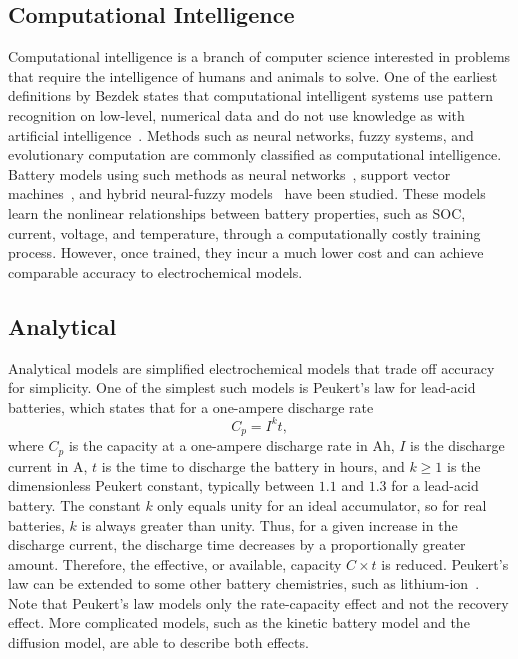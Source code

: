\documentclass[../zhang_thesis.tex]{subfiles}
\begin{document}
\subsection{Computational Intelligence}

Computational intelligence is a branch of computer science interested in problems that require the intelligence of humans and animals to solve. One of the earliest definitions by Bezdek states that computational intelligent systems use pattern recognition on low-level, numerical data and do not use knowledge as with artificial intelligence~\cite{bezdek92,bezdek94}. Methods such as neural networks, fuzzy systems, and evolutionary computation are commonly classified as computational
intelligence. Battery models using such methods as neural networks~\cite{ogorman98,capizzi11}, support vector machines~\cite{wang06}, and hybrid neural-fuzzy models~\cite{shen02} have been studied. These models learn the nonlinear relationships between battery properties, such as SOC, current, voltage, and temperature, through a computationally costly training process. However, once trained, they incur a much lower cost and can achieve comparable accuracy to electrochemical
models.

\subsection{Analytical}

Analytical models are simplified electrochemical models that trade off accuracy for simplicity. One of the simplest such models is Peukert's law for lead-acid batteries, which states that for a one-ampere discharge rate~\cite{doerffel06}
\begin{equation}
C_p = I^k t,
\end{equation}
where $C_p$ is the capacity at a one-ampere discharge rate in Ah, $I$ is the discharge current in A, $t$ is the time to discharge the battery in hours, and $k\ge 1$ is the dimensionless Peukert constant, typically between $1.1$ and $1.3$ for a lead-acid battery. The constant $k$ only equals unity for an ideal accumulator, so for real batteries, $k$ is always greater than unity. Thus, for a given increase in the discharge current, the discharge time decreases by a proportionally greater
amount. Therefore, the effective, or available, capacity $C\times t$ is reduced. Peukert's law can be extended to some other battery chemistries, such as lithium-ion~\cite{doerffel06}. Note that Peukert's law models only the rate-capacity effect and not the recovery effect. More complicated models, such as the kinetic battery model and the diffusion model, are able to describe both effects.
\end{document}
